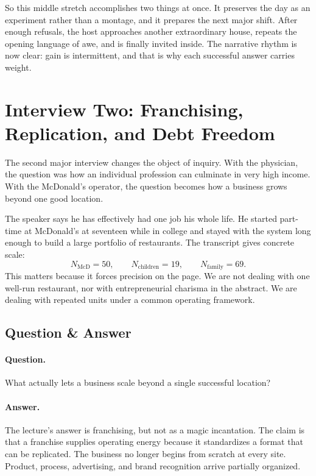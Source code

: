 So this middle stretch accomplishes two things at once. It preserves the day as an experiment rather than a montage, and it prepares the next major shift. After enough refusals, the host approaches another extraordinary house, repeats the opening language of awe, and is finally invited inside. The narrative rhythm is now clear: gain is intermittent, and that is why each successful answer carries weight.

\section{Interview Two: Franchising, Replication, and Debt Freedom}

The second major interview changes the object of inquiry. With the physician, the question was how an individual profession can culminate in very high income. With the McDonald's operator, the question becomes how a business grows beyond one good location.

The speaker says he has effectively had one job his whole life. He started part-time at McDonald's at seventeen while in college and stayed with the system long enough to build a large portfolio of restaurants. The transcript gives concrete scale:
\begin{equation}
N_{\mathrm{McD}} = 50, \qquad N_{\mathrm{children}} = 19, \qquad N_{\mathrm{family}} = 69.
\end{equation}
This matters because it forces precision on the page. We are not dealing with one well-run restaurant, nor with entrepreneurial charisma in the abstract. We are dealing with repeated units under a common operating framework.

\subsection{Question \& Answer}

\paragraph{Question.} What actually lets a business scale beyond a single successful location?

\paragraph{Answer.} The lecture's answer is franchising, but not as a magic incantation. The claim is that a franchise supplies operating energy because it standardizes a format that can be replicated. The business no longer begins from scratch at every site. Product, process, advertising, and brand recognition arrive partially organized.


